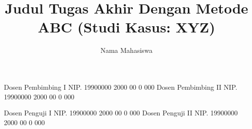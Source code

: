 \documentclass[article]{report} %
\begin{document}

    
    \title{Judul Tugas Akhir Dengan Metode ABC (Studi Kasus: XYZ)}
    
    \author{Nama Mahasiswa}		%
	
	\dosbingA%
		{Dosen Pembimbing I}%
		{NIP. 19900000 2000 00 0 000}	%
	\dosbingB%
		{Dosen Pembimbing II}%
		{NIP. 19900000 2000 00 0 000}	%
		
	\pengujiA%
		{Dosen Penguji I}%
		{NIP. 19900000 2000 00 0 000}	%
	\pengujiB%
		{Dosen Penguji II}%
		{NIP. 19900000 2000 00 0 000}	%

	\sloppy %
    \setcounter{page}{1} %

    
	\tableofcontents
	\pagebreak
	\listoftables
	\pagebreak
	\listoffigures
	\pagebreak
	\listofmyequations
	\lstlistoflistings
	\pagebreak
    
\end{document}
